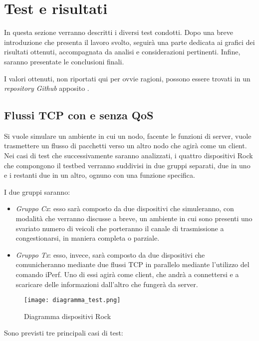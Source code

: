 \chapter{Test e risultati}

In questa sezione verranno descritti i diversi test condotti. Dopo una breve introduzione che presenta il lavoro svolto, seguirà una parte dedicata ai grafici dei risultati ottenuti, accompagnata da analisi e considerazioni pertinenti. Infine, saranno presentate le conclusioni finali.

I valori ottenuti, non riportati qui per ovvie ragioni, possono essere trovati in un \textit{repository Github} apposito \cite{ACPlot}.

\section{Flussi TCP con e senza QoS}
Si vuole simulare un ambiente in cui un nodo, facente le funzioni di server, vuole trasmettere un flusso di pacchetti verso un altro nodo che agirà come un client. 
Nei casi di test che successivamente saranno analizzati, i quattro dispositivi Rock che compongono il testbed verranno suddivisi in due gruppi separati, due in uno e i restanti due in un altro, ognuno con una funzione specifica.

I due gruppi saranno:
\begin{itemize}
    \item \textit{Gruppo Cx}: esso sarà composto da due dispositivi che simuleranno, con modalità che verranno discusse a breve, un ambiente in cui sono presenti uno svariato numero di veicoli che porteranno il canale di trasmissione a congestionarsi, in maniera completa o parziale.
    \item \textit{Gruppo Tx}: esso, invece, sarà composto da due dispositivi che comunicheranno mediante due flussi TCP in parallelo mediante l'utilizzo del comando iPerf. Uno di essi agirà come client, che andrà a connettersi e a scaricare delle informazioni dall'altro che fungerà da server.
\end{itemize}

\begin{figure}[h!]
    \centering
    \texttt{[image: diagramma\_test.png]}
    \caption{Diagramma dispositivi Rock}
    \label{fig:diagramma}
\end{figure}

Sono previsti tre principali casi di test:

